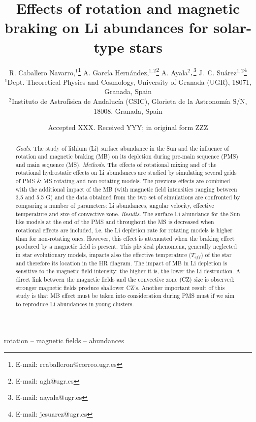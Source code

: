 \documentclass[fleqn,usenatbib]{mnras}
\title[Rotation, magnetic braking \& Li abundances]{Effects of rotation and magnetic braking on Li abundances for solar-type stars}
\author[R. Caballero Navarro et al.]{
R. Caballero Navarro,$^{1}$\thanks{E-mail: rcaballeron@correo.ugr.es}
A. Garc\'ia Hern\'andez,$^{1,2}$\thanks{E-mail: agh@ugr.es}
A. Ayala$^{2},$\thanks{E-mail: aayala@ugr.es}
J.~C. Su\'arez$^{1,2}$\thanks{E-mail: jcsuarez@ugr.es}
\\
$^{1}$Dept. Theoretical Physics and Cosmology, University of Granada (UGR), 18071, Granada, Spain\\
$^{2}$Instituto de Astrof\'isica de Andaluc\'ia (CSIC), Glorieta de la Astronom\'ia S/N, 18008, Granada, Spain\\
}
\date{Accepted XXX. Received YYY; in original form ZZZ}
\begin{document}
\label{firstpage}
\pagerange{\pageref{firstpage}--\pageref{lastpage}}
\maketitle

\begin{abstract}
\textit{Goals.} The study of lithium (Li) surface abundance in the Sun and the influence of rotation and magnetic braking (MB) on its depletion during pre-main sequence (PMS) and main sequence (MS).
\newline\textit{Methods.} The effects of rotational mixing and of the rotational hydrostatic effects on Li abundances are studied by simulating several grids of PMS \& MS rotating and non-rotating models. The previous effects are combined with the additional impact of the MB (with magnetic field intensities ranging between 3.5 and 5.5 G) and the data obtained from the two set of simulations are confronted by comparing a number of parameters: Li abundances, angular velocity, effective temperature and size of convective zone.
\newline\textit{Results.} The surface Li abundance for the Sun like models at the end of the PMS and throughout the MS is decreased when rotational effects are included, i.e. the Li depletion rate for rotating models is higher than for non-rotating ones. However, this effect is attenuated when the braking effect produced by a magnetic field is present. This physical phenomena, generally neglected in star evolutionary models, impacts also the effective temperature ($T_{eff}$) of the star and therefore its location in the HR diagram. The impact of MB in Li depletion is sensitive to the magnetic field intensity: the higher it is, the lower the Li destruction. A direct link between the magnetic fields and the convective zone (CZ) size is observed: stronger magnetic fields produce shallower CZ's. Another important result of this study is that MB effect must be taken into consideration during PMS must if we aim to reproduce Li abundances in young clusters.
\end{abstract}

\begin{keywords}
rotation -- magnetic fields -- abundances
\end{keywords}

\end{document}
